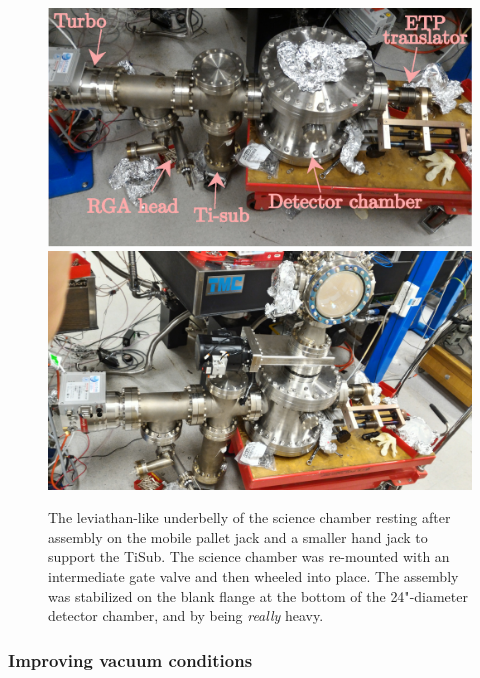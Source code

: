 	\begin{figure}
			\centering
		\includegraphics[width=\textwidth]{fig/lattice/detector_level.eps} %
		\includegraphics[width=\textwidth]{fig/lattice/full_assembly_20160915} %
			\caption{The leviathan-like underbelly of the science chamber resting after assembly on the mobile pallet jack and a smaller hand jack to support the TiSub.
		 The science chamber was re-mounted with an intermediate gate valve and then wheeled into place.
		The assembly was stabilized on the blank flange at the bottom of the {24"}-diameter detector chamber, and by being \emph{really} heavy.}
	\label{fig:underbelly}
	\end{figure}

	


	
	\subsubsection{Improving vacuum conditions}

